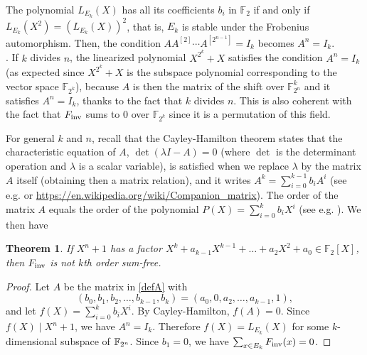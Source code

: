 \documentclass{amsart}
\newtheorem{thm}{Theorem}[section]
\numberwithin{equation}{section}
\theoremstyle{definition}
\newcommand{\f}{\Bbb F}
\newcommand{\fin}{F_{\text{\rm inv}}}
\begin{document}
\medskip

The polynomial $L_{E_k}(X)$ has all its coefficients $b_i$ in $\mathbb F_2$ if and only if $L_{E_k}(X^2)=(L_{E_k}(X))^2$, that is, $E_k$ is stable under the Frobenius automorphism. Then, the condition $AA^{[2]}\cdots A^{[2^{n-1}]}=I_k$ becomes $A^n=I_k$.\\

. If $k$ divides $n$, the linearized polynomial $X^{2^k}+X$ satisfies the condition $A^n=I_k$ (as expected since $X^{2^k}+X$ is the subspace polynomial corresponding to the vector space $\mathbb F_{2^k}$), because $A$ is then the matrix of the shift over $\mathbb{F}_{2^n}^k$ and it satisfies $A^n=I_k$, thanks to the fact that $k$ divides $n$. This is also coherent with the fact that $\fin$ sums to 0 over $\mathbb{F}_{2^k}$ since it is a permutation of this field. %

\medskip

For general $k$ and $n$, recall that the Cayley-Hamilton theorem states that the characteristic equation of $A$, $\det(\lambda I-A)=0$ (where $\det$ is the determinant operation and $\lambda$ is a scalar variable), is satisfied when we replace $\lambda$ by the matrix $A$ itself (obtaining then a matrix relation), and it writes $A^k=\sum_{i=0}^{k-1}b_{i}A^i$ (see e.g. \cite[pages 146-147]{HJ} or \url{https://en.wikipedia.org/wiki/Companion_matrix}). %
The order of the matrix $A$ equals the order of the polynomial $P(X)=\sum_{i=0}^k b_{i}X^i$ (see e.g. \cite{dar}). 
We then have 
\begin{thm}\label{pp9} 
If $X^n+1$ has a factor $X^k+a_{k-1}X^{k-1}+\dots +a_2X^2+a_0 \in \mathbb F_2[X]$,
then $\fin $ is not $k$th order sum-free.
\end{thm}

\begin{proof}
Let $A$ be the matrix in \eqref{defA} with 
\[
(b_0,b_1,b_2,\dots,b_{k-1},b_k)=(a_0,0,a_2,\dots,a_{k-1},1),
\]
and let $f(X)=\sum_{i=0}^kb_iX^i$. By Cayley-Hamilton, $f(A)=0$. Since $f(X)\mid X^n+1$, we have $A^n=I_k$. Therefore $f(X)=L_{E_k}(X)$ for some $k$-dimensional subspace of $\f_{2^n}$. Since $b_1=0$, we have $\sum_{x\in E_k}\fin(x)=0$.
\end{proof}
\end{document}
